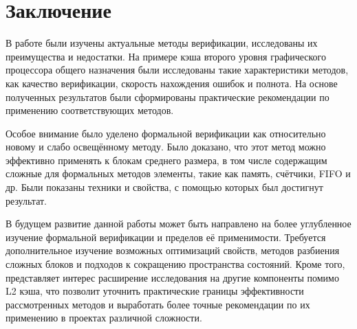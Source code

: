 \section{Заключение}

\tab В работе были изучены актуальные методы верификации, исследованы их преимущества и недостатки. На примере кэша второго уровня графического процессора общего назначения были исследованы такие характеристики методов, как качество верификации, скорость нахождения ошибок и полнота.  На основе полученных результатов были сформированы практические рекомендации по применению соответствующих методов. 

Особое внимание было уделено формальной верификации как относительно новому и слабо освещённому методу. Было доказано, что этот метод можно эффективно применять к блокам среднего размера, в том числе содержащим сложные для формальных методов элементы, такие как память, счётчики, FIFO и др. Были показаны техники и свойства, с помощью которых был достигнут результат. 

В будущем развитие данной работы может быть направлено на более углубленное изучение формальной верификации и пределов её применимости. Требуется дополнительное изучение возможных оптимизаций свойств, методов разбиения сложных блоков и подходов к сокращению пространства состояний. Кроме того, представляет интерес расширение исследования на другие компоненты помимо L2 кэша, что позволит уточнить практические границы эффективности рассмотренных методов и выработать более точные рекомендации по их применению в проектах различной сложности.
